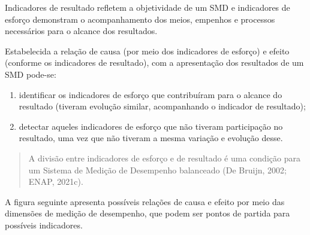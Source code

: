 \documentclass[
  letterpaper,
  DIV=11,
  numbers=noendperiod]{scrreprt}
\begin{document}
\begin{tcolorbox}[enhanced jigsaw, title=\textcolor{quarto-callout-warning-color}{\faExclamationTriangle}\hspace{0.5em}{Importante}, bottomrule=.15mm, arc=.35mm, bottomtitle=1mm, toprule=.15mm, coltitle=black, opacityback=0, colback=white, rightrule=.15mm, breakable, toptitle=1mm, leftrule=.75mm, titlerule=0mm, opacitybacktitle=0.6, colbacktitle=quarto-callout-warning-color!10!white, left=2mm, colframe=quarto-callout-warning-color-frame]

Indicadores de resultado refletem a objetividade de um SMD e indicadores
de esforço demonstram o acompanhamento dos meios, empenhos e processos
necessários para o alcance dos resultados.

\end{tcolorbox}

Estabelecida a relação de causa (por meio dos indicadores de esforço) e
efeito (conforme os indicadores de resultado), com a apresentação dos
resultados de um SMD pode-se:

\begin{enumerate}
\def\labelenumi{\arabic{enumi}.}
\item
  identificar os indicadores de esforço que contribuíram para o alcance
  do resultado (tiveram evolução similar, acompanhando o indicador de
  resultado);
\item
  detectar aqueles indicadores de esforço que não tiveram participação
  no resultado, uma vez que não tiveram a mesma variação e evolução
  desse.
\end{enumerate}

\begin{quote}
A divisão entre indicadores de esforço e de resultado é uma condição
para um Sistema de Medição de Desempenho balanceado (De Bruijn, 2002;
ENAP, 2021c).
\end{quote}

A figura seguinte apresenta possíveis relações de causa e efeito por
meio das dimensões de medição de desempenho, que podem ser pontos de
partida para possíveis indicadores.
\end{document}

